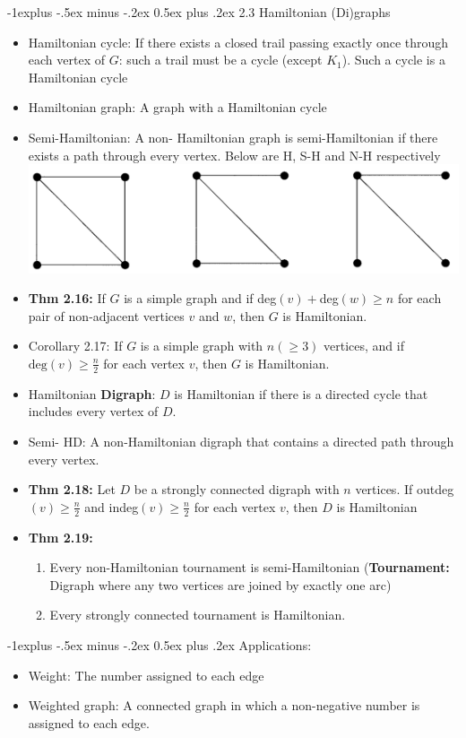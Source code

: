 \documentclass[10pt,landscape]{article}
\makeatletter
\renewcommand{\subsection}{\@startsection{subsection}{2}{0mm}%
                                {-1explus -.5ex minus -.2ex}%
                                {0.5ex plus .2ex}%
                                {\normalfont\normalsize\bfseries}}
\makeatother
\begin{document}
\begin{multicols}{2}
    \subsection{2.3 Hamiltonian (Di)graphs}
    \begin{itemize}
        \item Hamiltonian cycle: If there exists a closed trail passing exactly once through each vertex of $G$: such a trail must be a cycle (except $K_1$). Such a cycle is a Hamiltonian cycle
        \item Hamiltonian graph: A graph with a Hamiltonian cycle
        \item Semi-Hamiltonian: A non- Hamiltonian graph is semi-Hamiltonian if there exists a path through every vertex. Below are H, S-H and N-H respectively\\
        \includegraphics[width = 3 cm]{Hamiltonian_SH_NH.png}
        \item \textbf{Thm 2.16:} If $G$ is a simple graph and if deg$(v) + $deg$(w)\ge n$ for each pair of non-adjacent vertices $v$ and $w$, then $G$ is Hamiltonian.
        \item Corollary 2.17: If $G$ is a simple graph with $n (\ge 3)$ vertices, and if $\text{deg}(v)\ge \frac{n}{2}$ for each vertex $v$, then $G$ is Hamiltonian.
        \item Hamiltonian \textbf{Digraph}: $D$ is Hamiltonian if there is a directed cycle that includes every vertex of $D$.
        \item Semi- HD: A non-Hamiltonian digraph that contains a directed path through every vertex.
        \item \textbf{Thm 2.18:} Let $D$ be a strongly connected digraph with $n$ vertices. If outdeg$(v)\ge \frac{n}{2}$ and indeg$(v)\ge \frac{n}{2}$ for each vertex $v$, then $D$ is Hamiltonian 
        \item \textbf{Thm 2.19:}
        \begin{enumerate}
            \item Every non-Hamiltonian tournament is semi-Hamiltonian (\textbf{Tournament:} Digraph where any two vertices are joined by exactly one arc)
            \item Every strongly connected tournament is Hamiltonian.
        \end{enumerate} 
    \end{itemize}
    \subsection{Applications:}
    \begin{itemize}
        \item Weight: The number assigned to each edge 
        \item Weighted graph: A connected graph in which a non-negative number is assigned to each edge.
    \end{itemize}

\end{multicols}
\end{document}
